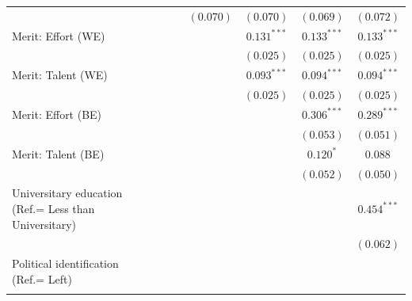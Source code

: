 \documentclass[
  12pt,
]{article}
\begin{document}
\begin{table}
\begin{center}
{\begin{tabular}{l c c c c c c c}
                                                      &                &                &                & $(0.070)$      & $(0.070)$      & $(0.069)$      & $(0.072)$      \\
Merit: Effort (WE)                                    &                &                &                &                & $0.131^{***}$  & $0.133^{***}$  & $0.133^{***}$  \\
                                                      &                &                &                &                & $(0.025)$      & $(0.025)$      & $(0.025)$      \\
Merit: Talent (WE)                                    &                &                &                &                & $0.093^{***}$  & $0.094^{***}$  & $0.094^{***}$  \\
                                                      &                &                &                &                & $(0.025)$      & $(0.025)$      & $(0.025)$      \\
Merit: Effort (BE)                                    &                &                &                &                &                & $0.306^{***}$  & $0.289^{***}$  \\
                                                      &                &                &                &                &                & $(0.053)$      & $(0.051)$      \\
Merit: Talent (BE)                                    &                &                &                &                &                & $0.120^{*}$    & $0.088$        \\
                                                      &                &                &                &                &                & $(0.052)$      & $(0.050)$      \\
Universitary education (Ref.= Less than Universitary) &                &                &                &                &                &                & $0.454^{***}$  \\
                                                      &                &                &                &                &                &                & $(0.062)$      \\
Political identification (Ref.= Left)                 &                &                &                &                &                &                &                \\
                                                      &                &                &                &                &                &                &                \\

\end{tabular}}
\end{center}
\end{table}
\end{document}
